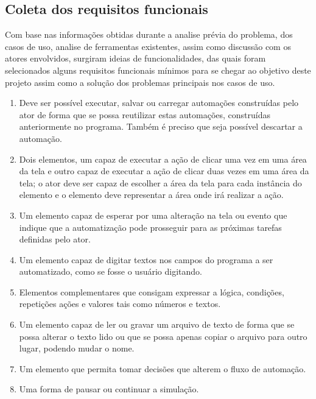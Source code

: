 \documentclass[tg]{mdtufsm}
\begin{document}
            \subsection{Coleta dos requisitos funcionais}

                Com base nas informações obtidas durante a analise prévia do problema, dos casos de uso, analise de ferramentas existentes, assim como discussão com os atores envolvidos, surgiram ideias de funcionalidades, das quais foram selecionados alguns requisitos funcionais mínimos para se chegar ao objetivo deste projeto assim como a solução dos problemas principais nos casos de uso.

                \begin{enumerate}

            		\item Deve ser possível executar, salvar ou carregar automações construídas pelo ator de forma que se possa reutilizar estas automações, construídas anteriormente no programa. Também é preciso que seja possível descartar a automação.

            		\item Dois elementos, um capaz de executar a ação de clicar uma vez em uma área da tela e outro capaz de executar a ação de clicar duas vezes em uma área da tela; o ator deve ser capaz de escolher a área da tela para cada instância do elemento e o elemento deve representar a área onde irá realizar a ação.

            		\item Um elemento capaz de esperar por uma alteração na tela ou evento que indique que a automatização pode prosseguir para as próximas tarefas definidas pelo ator.

                   \item Um elemento capaz de digitar textos nos campos do programa a ser automatizado, como se fosse o usuário digitando.

                   \item Elementos complementares que consigam expressar a lógica, condições, repetições ações e valores tais como números e textos.

                   \item Um elemento capaz de ler ou gravar um arquivo de texto de forma que se possa alterar o texto lido ou que se possa apenas copiar o arquivo para outro lugar, podendo mudar o nome.

                   \item Um elemento que permita tomar decisões que alterem o fluxo de automação.

                   \item Uma forma de pausar ou continuar a simulação.

            	\end{enumerate}
\end{document}
